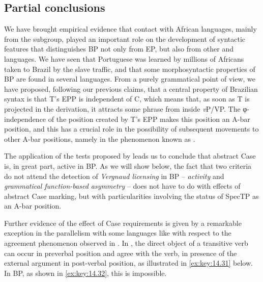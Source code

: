 \documentclass[output=paper]{langsci/langscibook}
\begin{document}
\subsection{Partial conclusions}\label{sec:key:14.4.3}

We have brought empirical evidence that contact with African languages, mainly
from the  subgroup, played an important role on the development of
syntactic features that distinguishes \gls{BP} not
only from \gls{EP}, but also from other 
and  languages. We have seen that Portuguese was learned by
millions of Africans taken to Brazil by the slave traffic, and that some
morphosyntactic properties of \gls{BP} are found in
several  languages. From a purely grammatical point of view, we have
proposed, following our previous claims, that a central property of Brazilian
syntax is that T’s \gls{EPP} is independent
of C, which means that, as soon as T is projected in the derivation, it
attracts some phrase from inside \emph{v}P/VP. The φ-independence of the
position created by T’s \gls{EPP} makes this
position an A-bar position, and this has a crucial role in the possibility of
subsequent movements to other A-bar positions, namely in the phenomenon known
as .

The application of the tests proposed by \textcite{SheevanderWal2018} leads us
to conclude that abstract Case is, in great part, active in
\gls{BP}. As we will show below, the fact that two
criteria do not attend the detection of \emph{Vergnaud licensing} in
\gls{BP} – \emph{activity} and \emph{grammatical
function-based asymmetry} – does not have to do with effects of abstract Case
marking, but with particularities involving the status of SpecTP as an A-bar
position.

Further evidence of the effect of Case requirements is given by a remarkable
exception in the parallelism with some  languages like  with
respect to the agreement phenomenon observed in . In
, the direct object of a transitive verb can occur in preverbal
position and agree with the verb, in presence of the external argument in
post-verbal position, as illustrated in \eqref{ex:key:14.31} below. In \gls{BP}, as
shown in \eqref{ex:key:14.32}, this is impossible.
\end{document}
